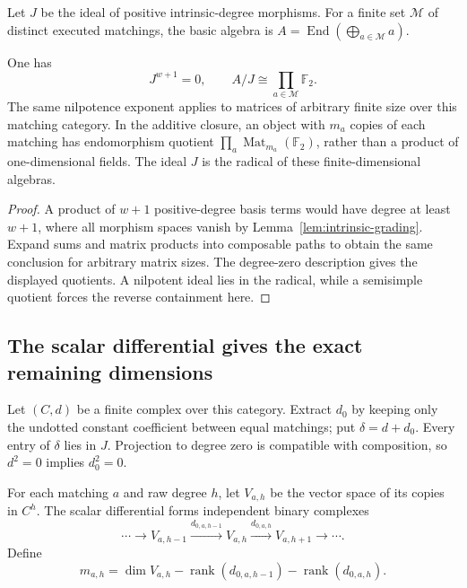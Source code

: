 Let $J$ be the ideal of positive intrinsic-degree morphisms.  For a finite
set $\mathcal M$ of distinct executed matchings, the basic algebra is
$A=\operatorname{End}(\bigoplus_{a\in\mathcal M}a)$.

\begin{corollary}
\label{cor:radical-nilpotence}
One has
\[
 J^{w+1}=0,\qquad A/J\cong\prod_{a\in\mathcal M}\mathbb F_2.
\]
The same nilpotence exponent applies to matrices of arbitrary finite size
over this matching category.  In the additive closure, an object with
$m_a$ copies of each matching has endomorphism quotient
$\prod_a\operatorname{Mat}_{m_a}(\mathbb F_2)$, rather than a product of
one-dimensional fields.  The ideal $J$ is the radical of these
finite-dimensional algebras.
\end{corollary}

\begin{proof}
A product of $w+1$ positive-degree basis terms would have degree at least
$w+1$, where all morphism spaces vanish by
Lemma~\ref{lem:intrinsic-grading}.  Expand sums and matrix products into
composable paths to obtain the same conclusion for arbitrary matrix
sizes.  The degree-zero description gives the displayed quotients.  A
nilpotent ideal lies in the radical, while a semisimple quotient forces
the reverse containment here.
\end{proof}

\subsection{The scalar differential gives the exact remaining dimensions}

Let $(C,d)$ be a finite complex over this category.  Extract $d_0$ by
keeping only the undotted constant coefficient between equal matchings;
put $\delta=d+d_0$.  Every entry of $\delta$ lies in $J$.  Projection to
degree zero is compatible with composition, so $d^2=0$ implies
$d_0^2=0$.

For each matching $a$ and raw degree $h$, let $V_{a,h}$ be the vector space
of its copies in $C^h$.  The scalar differential forms independent binary
complexes
\[
 \cdots\longrightarrow V_{a,h-1}
 \xrightarrow{d_{0,a,h-1}}V_{a,h}
 \xrightarrow{d_{0,a,h}}V_{a,h+1}\longrightarrow\cdots.
\]
Define
\begin{equation}
 m_{a,h}=\dim V_{a,h}
          -\operatorname{rank}(d_{0,a,h-1})
          -\operatorname{rank}(d_{0,a,h}).
 \label{eq:scalar-minimal-profile}
\end{equation}

